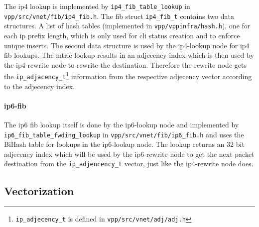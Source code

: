 



The ip4 lookup is implemented by \lstinline|ip4_fib_table_lookup| in
\lstinline|vpp/src/vnet/fib/ip4_fib.h|. The \Ac{fib} struct
\lstinline|ip4_fib_t| contains two data structures. A list of hash
tables (implemented in \lstinline|vpp/vppinfra/hash.h|), one for each
ip prefix length, which is only used for \Ac{cli} status creation and
to enforce unique inserts. The second data structure is used by the
ip4-lookup node for \Ac{ip4} \Ac{fib} lookups. The mtrie lookup
results in an adjecency index which is then used by the ip4-rewrite
node to rewrite the destination. Therefore the rewrite node gets the
\lstinline|ip_adjacency_t|\footnote{\lstinline|ip_adjecency_t| is
defined in \lstinline|vpp/src/vnet/adj/adj.h|} information from the
respective adjecency vector according to the adjecency index.


\paragraph{ip6-fib}

The \Ac{ip6} \Ac{fib} lookup itself is done by the ip6-lookup node and
implemented by \lstinline|ip6_fib_table_fwding_lookup| in
\lstinline|vpp/src/vnet/fib/ip6_fib.h| and uses the BiHash table for
lookups in the ip6-lookup node. The lookup returns an 32 bit adjecency
index which will be used by the ip6-rewrite node to get the next
packet destination from the \lstinline|ip_adjencency_t| vector, just
like the ip4-rewrite node does.



\subsection{Vectorization}
\label{sec:vectorization}


